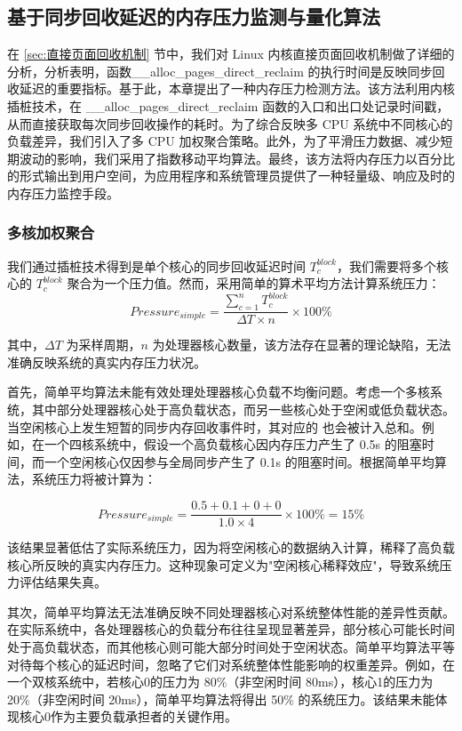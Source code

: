 \subsection{基于同步回收延迟的内存压力监测与量化算法}
\label{sec:基于同步回收延迟的内存压力监测与量化算法}

在 \ref{sec:直接页面回收机制} 节中，我们对 Linux 内核直接页面回收机制做了详细的分析，分析表明，函数\_\_alloc\_pages\_direct\_reclaim 的执行时间是反映同步回收延迟的重要指标。基于此，本章提出了一种内存压力检测方法。该方法利用内核插桩技术，在 \_\_alloc\_pages\_direct\_reclaim 函数的入口和出口处记录时间戳，从而直接获取每次同步回收操作的耗时。为了综合反映多 CPU 系统中不同核心的负载差异，我们引入了多 CPU 加权聚合策略。此外，为了平滑压力数据、减少短期波动的影响，我们采用了指数移动平均算法。最终，该方法将内存压力以百分比的形式输出到用户空间，为应用程序和系统管理员提供了一种轻量级、响应及时的内存压力监控手段。

\subsubsection{多核加权聚合}

我们通过插桩技术得到是单个核心的同步回收延迟时间 \(T_c^{block}\)，我们需要将多个核心的 \(T_c^{block}\) 聚合为一个压力值。然而，采用简单的算术平均方法计算系统压力：
\begin{equation}
    Pressure_{simple} = \frac{\sum_{c=1}^{n} T_c^{block}}{\Delta T \times n} \times 100\%
\end{equation}

其中，\(\Delta T\) 为采样周期，\(n\) 为处理器核心数量，该方法存在显著的理论缺陷，无法准确反映系统的真实内存压力状况。

首先，简单平均算法未能有效处理处理器核心负载不均衡问题。考虑一个多核系统，其中部分处理器核心处于高负载状态，而另一些核心处于空闲或低负载状态。当空闲核心上发生短暂的同步内存回收事件时，其对应的  也会被计入总和。例如，在一个四核系统中，假设一个高负载核心因内存压力产生了 0.5s 的阻塞时间，而一个空闲核心仅因参与全局同步产生了 0.1s 的阻塞时间。根据简单平均算法，系统压力将被计算为：

\[
Pressure_{simple} = \frac{0.5 + 0.1 + 0 + 0}{1.0 \times 4} \times 100\% = 15\%
\]

该结果显著低估了实际系统压力，因为将空闲核心的数据纳入计算，稀释了高负载核心所反映的真实内存压力。这种现象可定义为"空闲核心稀释效应"，导致系统压力评估结果失真。

其次，简单平均算法无法准确反映不同处理器核心对系统整体性能的差异性贡献。在实际系统中，各处理器核心的负载分布往往呈现显著差异，部分核心可能长时间处于高负载状态，而其他核心则可能大部分时间处于空闲状态。简单平均算法平等对待每个核心的延迟时间，忽略了它们对系统整体性能影响的权重差异。例如，在一个双核系统中，若核心0的压力为 80\%（非空闲时间 80ms），核心1的压力为 20\%（非空闲时间 20ms），简单平均算法将得出 50\% 的系统压力。该结果未能体现核心0作为主要负载承担者的关键作用。

